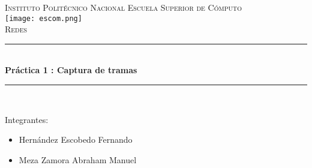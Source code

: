 \documentclass[a4paper,12pt]{article}
\begin{document}
\begin{titlepage}

\newcommand{\HRule}{\rule{\linewidth}{0.5mm}} %

\center %
 

\textsc{\LARGE Instituto Politécnico Nacional  Escuela Superior de Cómputo}\\[1.5cm] %
\texttt{[image: escom.png]}\\[1cm] %
\textsc{\Large Redes}\\[0.5cm] %


\HRule \\[0.4cm]
{ \huge \bfseries Práctica 1 : Captura de tramas}\\[0.4cm] %
\HRule \\[1.5cm]
 

\begin{minipage}{0.6\textwidth}
\begin{flushleft} \large
\begin{center}
Integrantes:
\end{center}
\begin{itemize}
\item Hernández Escobedo Fernando
\item Meza Zamora  Abraham Manuel 
\end{itemize}
\end{flushleft}

\end{minipage}\\[2cm]


\end{titlepage}
\end{document}
